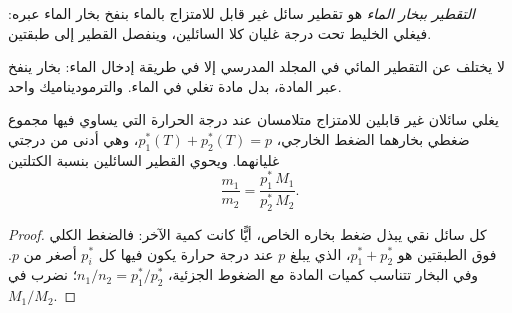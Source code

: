\begin{definition}\label{def:b2:liquid-vapour-diagrams:steam-distillation}
\emph{التقطير ببخار الماء} هو تقطير
سائل غير قابل للامتزاج بالماء بنفخ بخار الماء عبره: فيغلي الخليط
تحت درجة غليان كلا السائلين، وينفصل القطير إلى
طبقتين.
\end{definition}

لا يختلف  عن التقطير المائي في المجلد المدرسي
إلا في طريقة إدخال الماء: بخار ينفخ عبر المادة، بدل
مادة تغلي في الماء. والترموديناميك واحد.

\begin{proposition}\label{prop:b2:liquid-vapour-diagrams:steam}
يغلي سائلان غير قابلين للامتزاج متلامسان عند درجة الحرارة التي يساوي فيها مجموع
ضغطي بخارهما الضغط الخارجي، $p_1^*(T) + p_2^*(T) =
p$، وهي أدنى من درجتي غليانهما. ويحوي القطير السائلين
بنسبة الكتلتين
\[
  \frac{m_1}{m_2} = \frac{p_1^*\,M_1}{p_2^*\,M_2} .
\]
\end{proposition}

\begin{proof}
كل سائل نقي يبذل ضغط بخاره الخاص، أيًّا كانت كمية
الآخر: فالضغط الكلي فوق الطبقتين هو $p_1^* + p_2^*$، الذي
يبلغ $p$ عند درجة حرارة يكون فيها كل $p_i^*$ أصغر من $p$. وفي
البخار تتناسب كميات المادة مع الضغوط الجزئية، $n_1/n_2 =
p_1^*/p_2^*$؛ نضرب في $M_1/M_2$.
\end{proof}

